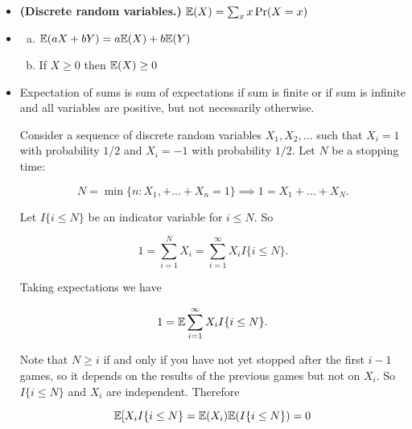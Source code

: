 \begin{itemize}
\begin{itemize}
\begin{remark}
\end{remark}

\item \begin{definition} \textbf{(Discrete random variables.)} \(\mathbb{E}(X) = \sum_x x \Pr(X = x)\) \end{definition}

\item \begin{theorem} 

\begin{enumerate}[(a)]

\item \(\mathbb{E}(aX + bY) = a \mathbb{E}(X) + b \mathbb{E}(Y)\) 

\item If \(X \geq 0\) then \(\mathbb{E}(X) \geq 0\)

\end{enumerate}
\end{theorem}

\item \begin{theorem}Expectation of sums is sum of expectations if sum is finite or if sum is infinite and all variables are positive, but not necessarily otherwise.

\end{theorem}

\begin{example}\label{prob.ex.cont.sum.ex} Consider a sequence of discrete random variables \(X_1, X_2, \ldots\) such that \(X_i = 1 \) with probability \(1/2\) and \(X_i = - 1\) with probability \(1/2\). Let \(N\) be a stopping time:

\[
N = \min \{n: X_1, + \ldots + X_n = 1\} \implies 1 = X_1 + \ldots + X_N.
\] 

Let \(I\{i \leq N\}\) be an indicator variable for \(i \leq N\). So

\[
1 = \sum_{i=1}^N X_i = \sum_{i=1}^\infty X_i I\{i \leq N\}.
\]

Taking expectations we have

\[
1 = \mathbb{E} \sum_{i=1}^\infty X_i I\{i \leq N\}.
\]

Note that \(N \geq i\) if and only if you have not yet stopped after the first \(i-1\) games, so it depends on the results of the previous games but not on \(X_i\). So \(I\{i \leq N\}\) and \(X_i\) are independent. Therefore

\[
  \mathbb{E} [ X_i I\{i \leq N\} = \mathbb{E}(X_i) \mathbb{E}( I\{i \leq N\}) = 0
\]


\end{example}
\end{itemize}
\end{itemize}
